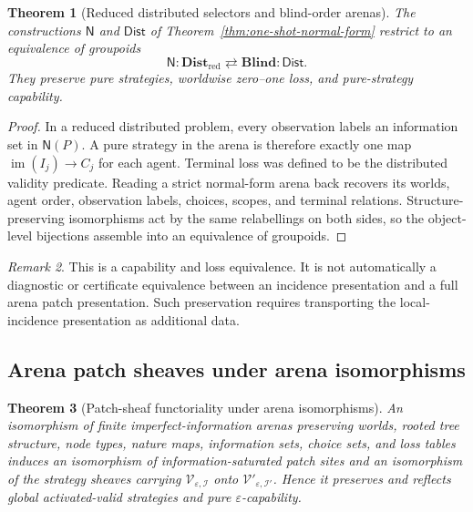 \documentclass[11pt]{article}
\theoremstyle{plain}
\newtheorem{theorem}{Theorem}[section]
\theoremstyle{definition}
\theoremstyle{remark}
\newtheorem{remark}[theorem]{Remark}
\newcommand{\im}{\operatorname{im}}
\newcommand{\eps}{\varepsilon}
\begin{document}
\begin{theorem}[Reduced distributed selectors and blind-order arenas]
\label{thm:dist-blind-groupoid-monograph}
The constructions $\mathsf N$ and $\mathsf{Dist}$ of
Theorem~\ref{thm:one-shot-normal-form} restrict to an equivalence of groupoids
\[
\mathsf N:\mathbf{Dist}_{\mathrm{red}}
\rightleftarrows
\mathbf{Blind}:\mathsf{Dist}.
\]
They preserve pure strategies, worldwise zero--one loss, and pure-strategy
capability.
\end{theorem}

\begin{proof}
In a reduced distributed problem, every observation labels an information set in
$\mathsf N(P)$. A pure strategy in the arena is therefore exactly one map
$\im(I_j)\to C_j$ for each agent. Terminal loss was defined to be the distributed
validity predicate. Reading a strict normal-form arena back recovers its worlds,
agent order, observation labels, choices, scopes, and terminal relations.
Structure-preserving isomorphisms act by the same relabellings on both sides,
so the object-level bijections assemble into an equivalence of groupoids.
\end{proof}

\begin{remark}
This is a capability and loss equivalence. It is not automatically a diagnostic
or certificate equivalence between an incidence presentation and a full arena
patch presentation. Such preservation requires transporting the local-incidence
presentation as additional data.
\end{remark}

\subsection{Arena patch sheaves under arena isomorphisms}

\begin{theorem}[Patch-sheaf functoriality under arena isomorphisms]
\label{thm:patch-sheaf-functoriality-monograph}
An isomorphism of finite imperfect-information arenas preserving worlds, rooted
tree structure, node types, nature maps, information sets, choice sets, and loss
tables induces an isomorphism of information-saturated patch sites and an
isomorphism of the strategy sheaves carrying
$\mathscr V_{\eps,\mathcal I}$ onto $\mathscr V'_{\eps,\mathcal I'}$. Hence it
preserves and reflects global activated-valid strategies and pure
$\eps$-capability.
\end{theorem}
\end{document}
